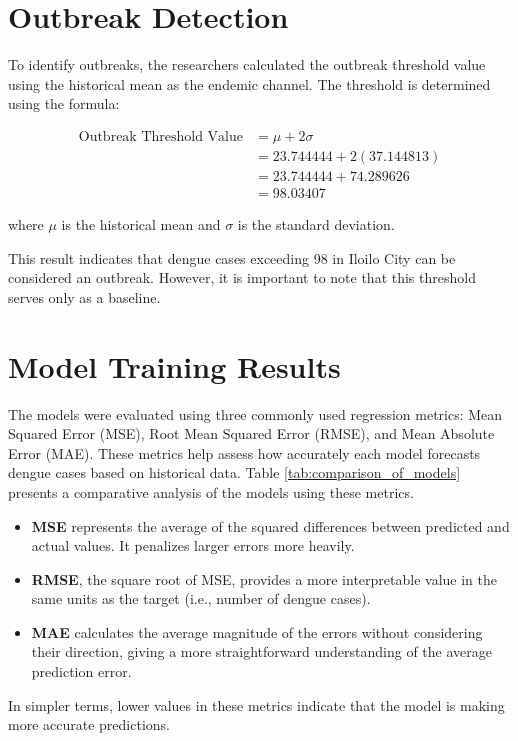\clearpage

\section{Outbreak Detection}
To identify outbreaks, the researchers calculated the outbreak threshold value using the historical mean as the endemic channel. The threshold is determined using the formula:  

\begin{align}  
	\text{Outbreak Threshold Value} &= \mu + 2\sigma \\  
	&= 23.744444 + 2(37.144813) \\  
	&= 23.744444 + 74.289626 \\  
	&= 98.03407  
\end{align}  

where \(\mu\) is the historical mean and \(\sigma \) is the standard deviation.

This result indicates that dengue cases exceeding 98 in Iloilo City can be considered an outbreak. However, it is important to note that this threshold serves only as a baseline. 

\section{Model Training Results}

The models were evaluated using three commonly used regression metrics: Mean Squared Error (MSE), Root Mean Squared Error (RMSE), and Mean Absolute Error (MAE). These metrics help assess how accurately each model forecasts dengue cases based on historical data. Table \ref{tab:comparison_of_models} presents a comparative analysis of the models using these metrics.
\begin{itemize}
	\item \textbf{MSE} represents the average of the squared differences between predicted and actual values. It penalizes larger errors more heavily.
	\item \textbf{RMSE}, the square root of MSE, provides a more interpretable value in the same units as the target (i.e., number of dengue cases).
	\item \textbf{MAE} calculates the average magnitude of the errors without considering their direction, giving a more straightforward understanding of the average prediction error.
\end{itemize}

In simpler terms, lower values in these metrics indicate that the model is making more accurate predictions.

